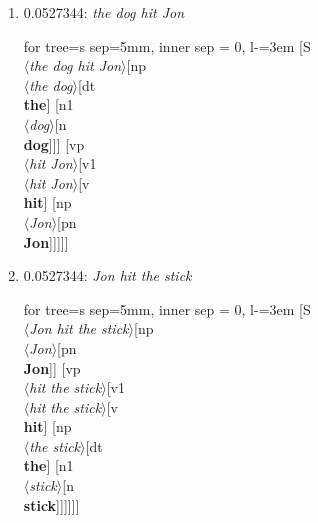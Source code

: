 \documentclass[11pt]{article}
\begin{document}
\begin{enumerate}
	\item  0.0527344: \textit{the dog hit Jon} \\[0.5em]
	\begin{adjustbox}{max width = \textwidth}
	\begin{forest}
	for tree={s sep=5mm, inner sep = 0, l-=3em}
	[S\\$\langle$\textit{the dog hit Jon}$\rangle$[np\\$\langle$\textit{the dog}$\rangle$[dt\\\textbf{the}] [n1\\$\langle$\textit{dog}$\rangle$[n\\\textbf{dog}]]] [vp\\$\langle$\textit{hit Jon}$\rangle$[v1\\$\langle$\textit{hit Jon}$\rangle$[v\\\textbf{hit}] [np\\$\langle$\textit{Jon}$\rangle$[pn\\\textbf{Jon}]]]]]
	\end{forest}
	\end{adjustbox}
	\newpage

	\item  0.0527344: \textit{Jon hit the stick} \\[0.5em]
	\begin{adjustbox}{max width = \textwidth}
	\begin{forest}
	for tree={s sep=5mm, inner sep = 0, l-=3em}
	[S\\$\langle$\textit{Jon hit the stick}$\rangle$[np\\$\langle$\textit{Jon}$\rangle$[pn\\\textbf{Jon}]] [vp\\$\langle$\textit{hit the stick}$\rangle$[v1\\$\langle$\textit{hit the stick}$\rangle$[v\\\textbf{hit}] [np\\$\langle$\textit{the stick}$\rangle$[dt\\\textbf{the}] [n1\\$\langle$\textit{stick}$\rangle$[n\\\textbf{stick}]]]]]]
	\end{forest}
	\end{adjustbox}
	\newpage


\end{enumerate}
\end{document}
